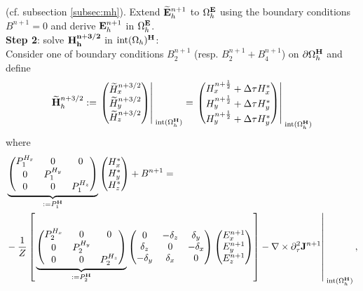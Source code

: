 \documentclass[12pt,reqno]{amsart}
\newcommand{\e}{{\bf E}}
\newcommand{\h}{{\bf H}}
\newcommand{\J}{{\bf J}}
\theoremstyle{definition}
\numberwithin{equation}{section}
\newcommand{\intr}[1]{\mathrm{int}(#1)}
\def\Gwh{\Omega_h}
\begin{document}
	(cf. subsection \ref{subsec:mh}).
	Extend $\widetilde{\e}_h^{n+1}$
to $\Gwh^\e$ using the boundary conditions $B^{n+1}=0$ and derive 
$\e_h^{n+1}$ in $\Gwh^\e$. 
	\\[2mm]
	{\bf Step 2}: solve $\bf{H}^{n+3/2}_h$ in $\intr\Gwh^\h$: \\[2mm]
	Consider one of  boundary conditions $B_2^{n+1}$ (resp. $B_2^{n+1}+B_4^{n+1}$) on
 $\partial \Gwh^\h$
and define
	$$
	\widetilde{\h}_h^{n+3/2}:=
	\left.
	\begin{pmatrix}
		\widetilde{H}_x^{n+3/2}\\
		\widetilde{H}_y^{n+3/2}\\
		\widetilde{H}_z^{n+3/2}
	\end{pmatrix}\right|_{\; \intr{\Gwh^{\h}}}^{\;}=
\left.
	\begin{pmatrix}
		H_x^{n+\frac{1}{2}}+\Delta \tau H_x^{*}\\
		H_y^{n+\frac{1}{2}}+\Delta \tau H_y^{*}\\
		H_y^{n+\frac{1}{2}}+\Delta \tau H_y^{*}
	\end{pmatrix}\right|_{\; \intr{\Gwh^{\h}}}^{\;}
	$$
	where 
	\begin{align*}
		&
	\underbrace{
	\begin{pmatrix}
		P_1^{H_x}  & 0&0 \\
		0 & 	P_1^{H_y}  &\\
		0&0&	P_1^{H_z} 
	\end{pmatrix}
}_{:=P_1^\h}
	\begin{pmatrix}
		H_x^{*}\\
		H_y^{*} \\
		H_z^{*}
	\end{pmatrix}+B^{n+1}
=\\&
-\frac{1}{Z}
\left[ \left.
	\underbrace{
	\begin{pmatrix}
		P_2^{H_x} & 0&0 \\
		0 & P_2^{H_y} &\\
		0&0&P_2^{H_z} 
	\end{pmatrix}
}_{:=P_2^\h}
	\begin{pmatrix}
		0& -\delta_z & \delta _y\\
		\delta_z&0&-\delta_x\\
		-\delta_y&\delta_x&0\\
	\end{pmatrix}
	\begin{pmatrix}
		E_x^{n+1}\\
		E_y^{n+1}\\
		E_z^{n+1}
	\end{pmatrix}\right]	-\nabla\times\partial_{\tau}^2\J^{n+1}\right|_{\; \intr{\Gwh^{\h}}}^{\;},
\end{align*}
\end{document}
